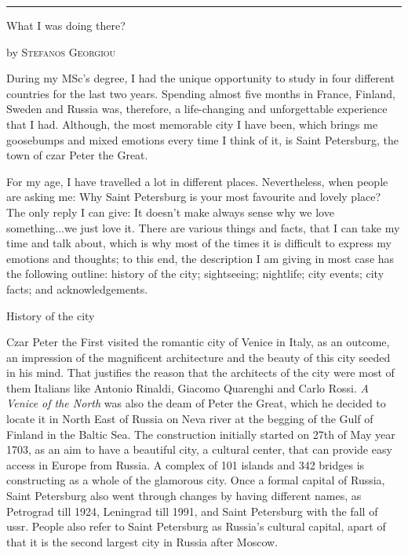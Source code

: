 \documentclass[10pt,a4paper]{article} %
\newcommand{\SepRule}{\noindent	%
\begin{center}
\rule{250pt}{1pt} %
\end{center}
}
\newcommand{\NewsItem}[1]{ %
\usefont{T1}{fvs}{n}{n} %
\vspace{24pt}\large #1\vspace{3pt} %
\par \normalsize \normalfont}
\newcommand{\NewsAuthor}[1]{ %
\hfill by \textsc{#1} \vspace{20pt} %
\par \normalfont}
\begin{document}
\vspace{0.5cm}
\SepRule %
\vspace{0.5cm}

\begin{multicols}{3} %


\NewsItem{What I was doing there?}
\NewsAuthor{Stefanos Georgiou}\begin{flushleft}
	
\end{flushleft}
During my MSc’s degree, I had the unique opportunity to study
in four different countries for the last two years.
Spending almost five months in France, Finland, Sweden and Russia was,
therefore, a life-changing and unforgettable experience that I had.
Although, the most memorable city I have been, which brings me goosebumps
and mixed emotions every time I think of it, is Saint Petersburg,
the town of czar Peter the Great.

For my age, I have travelled a lot in different places.
Nevertheless, when people are asking me: Why Saint Petersburg is your most favourite and lovely place?
The only reply I can give: It doesn’t make always sense why we love something...we just love it.
There are various things and facts, that I can take my time and talk about,
which is why most of the times it is difficult to express my emotions and thoughts;
to this end, the description I am giving in most case has the following outline:
history of the city; sightseeing; nightlife; city events; city facts; and acknowledgements.

\NewsItem{History of the city}
Czar Peter the First visited the romantic city of Venice in Italy, as an outcome, 
an impression of the magnificent architecture and the beauty of this city 
seeded in his mind. 
That justifies the reason that the architects of the city were most of them Italians 
like Antonio Rinaldi, Giacomo Quarenghi and Carlo Rossi. 
\textit{A Venice of the North} was also the deam of Peter the Great, 
which he decided to locate it in North East of Russia on Neva river 
at the begging of the Gulf of Finland in the Baltic Sea. 
The construction initially started on 27th of May year 1703, 
as an aim to have a beautiful city, a cultural center, 
that can provide easy access in Europe from Russia. 
A complex of 101 islands and 342 bridges is constructing as a whole of the glamorous city. 
Once a formal capital of Russia, Saint Petersburg also went through 
changes by having different names, as Petrograd till 1924, Leningrad till 1991, 
and Saint Petersburg with the fall of {\sc ussr}. 
People also refer to Saint Petersburg as Russia's cultural capital, 
apart of that it is the second largest city in Russia after Moscow.

\end{multicols} %
\end{document}
